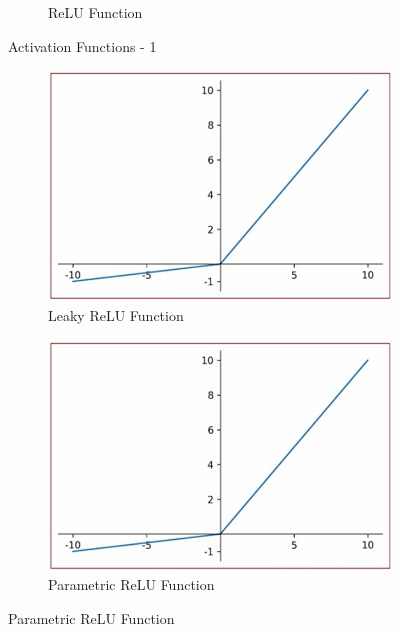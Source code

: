 \documentclass[a4paper]{article}
\begin{document}
\begin{itemize}
\begin{figure}[H]
\begin{subfigure}[b]{0.3\textwidth}
            \caption{ReLU Function}
        \end{subfigure}
        \caption{Activation Functions - 1}
    \end{figure}
    \begin{figure}[H]
        \centering
        \begin{subfigure}[b]{0.3\textwidth}
            \centering
            \includegraphics[width=\textwidth]{Degree/static/DL_Leaky_ReLU_function.png}
            \caption{Leaky ReLU Function}
        \end{subfigure}
        \hfill
        \begin{subfigure}[b]{0.3\textwidth}
            \centering
            \includegraphics[width=\textwidth]{Degree/static/DL_Leaky_ReLU_function.png}
            \caption{Parametric ReLU Function}
        \end{subfigure}
        \hfill

\end{figure}
\end{itemize}
\end{document}
